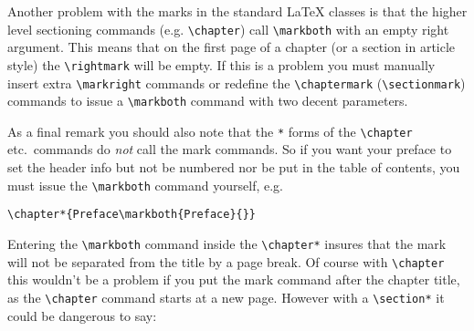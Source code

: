 \documentclass[a4paper]{article}
\def\latex/{\protect\LaTeX{}}
\begin{document}
Another problem with the marks in the standard \latex/ classes is that the
higher level sectioning commands (e.g. \verb|\chapter|) call
\verb|\markboth| with an empty right argument. This means that on the first
page of a chapter (or a section in article style) the \verb|\rightmark|
will be empty. If this is a problem you must manually insert extra
\verb|\markright| commands or redefine the \verb|\chaptermark|
(\verb|\sectionmark|) commands to issue a \verb|\markboth| command with
two decent parameters.

As a final remark you should also note that the \verb|*| forms of the
\verb|\chapter| etc.\ commands do \emph{not} call the mark commands. So if
you want your preface to set the header info but not be numbered nor be put in
the table of contents, you must issue the \verb|\markboth| command
yourself, e.g.

\begin{verbatim}
\chapter*{Preface\markboth{Preface}{}}
\end{verbatim}

Entering the \verb|\markboth| command inside the \verb|\chapter*| insures
that the mark will not be separated from the title by a page break. Of
course with \verb|\chapter| this wouldn't be  a problem if you put the mark
command after the chapter title, as the \verb|\chapter| command starts at a
new page. However with a \verb|\section*| it could be dangerous to say:
\end{document}

